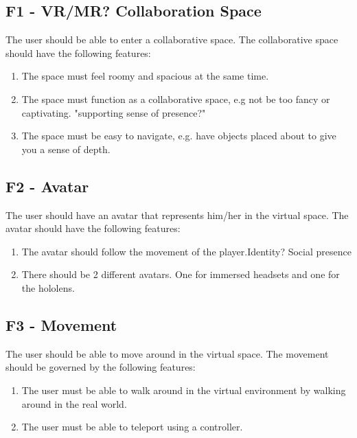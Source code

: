         \subsection{F1 - VR/MR? Collaboration Space}
        The user should be able to enter a collaborative space. The collaborative space should have the following features:
        \begin{enumerate}
            \item The space must feel roomy and spacious at the same time.
            \item The space must function as a collaborative space, e.g not be too fancy or captivating.  "supporting sense of presence?"
            \item The space must be easy to navigate, e.g. have objects placed about to give you a sense of depth.
        \end{enumerate}
        
        \subsection{F2 - Avatar}
        The user should have an avatar that represents him/her in the virtual space. The avatar should have the following features:
        \begin{enumerate}
            \item The avatar should follow the movement of the player.Identity? Social presence
            \item There should be 2 different avatars. One for immersed headsets and one for the hololens.
        \end{enumerate}
        
        \subsection{F3 - Movement}
        The user should be able to move around in the virtual space. The movement should be governed by the following features:
        \begin{enumerate}
            \item The user must be able to walk around in the virtual environment by walking around in the real world.
            \item The user must be able to teleport using a controller.
        \end{enumerate}
        
